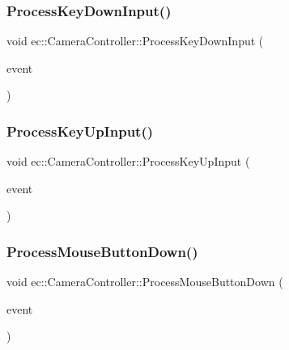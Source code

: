 \subsubsection{\texorpdfstring{Process\+Key\+Down\+Input()}{ProcessKeyDownInput()}}
{\footnotesize\ttfamily void ec\+::\+Camera\+Controller\+::\+Process\+Key\+Down\+Input (\begin{DoxyParamCaption}\item[{const \mbox{\hyperlink{structec_1_1_keyboard_event}{Keyboard\+Event}} \&}]{event }\end{DoxyParamCaption})\hspace{0.3cm}{\ttfamily [protected]}}

\mbox{\label{classec_1_1_camera_controller_a0835439332db0736a86ec307ef73f3fc}} 
\subsubsection{\texorpdfstring{Process\+Key\+Up\+Input()}{ProcessKeyUpInput()}}
{\footnotesize\ttfamily void ec\+::\+Camera\+Controller\+::\+Process\+Key\+Up\+Input (\begin{DoxyParamCaption}\item[{const \mbox{\hyperlink{structec_1_1_keyboard_event}{Keyboard\+Event}} \&}]{event }\end{DoxyParamCaption})\hspace{0.3cm}{\ttfamily [protected]}}

\mbox{\label{classec_1_1_camera_controller_a079ec204c0825113af01b5b79c005eb1}} 
\subsubsection{\texorpdfstring{Process\+Mouse\+Button\+Down()}{ProcessMouseButtonDown()}}
{\footnotesize\ttfamily void ec\+::\+Camera\+Controller\+::\+Process\+Mouse\+Button\+Down (\begin{DoxyParamCaption}\item[{const \mbox{\hyperlink{structec_1_1_mouse_event}{Mouse\+Event}} \&}]{event }\end{DoxyParamCaption})\hspace{0.3cm}{\ttfamily [protected]}}

